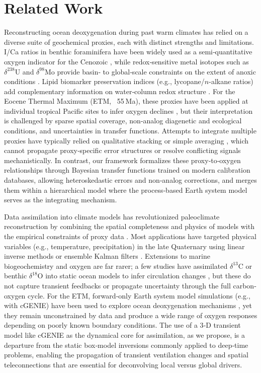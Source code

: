 \documentclass{article}
\begin{document}
\section{Related Work}

Reconstructing ocean deoxygenation during past warm climates has relied on a diverse suite of geochemical proxies, each with distinct strengths and limitations. I/Ca ratios in benthic foraminifera have been widely used as a semi‐quantitative oxygen indicator for the Cenozoic \cite{Dickson2012Iodine,Hoogakker2015ICa}, while redox‐sensitive metal isotopes such as $\delta^{238}$U and $\delta^{98}$Mo provide basin‐ to global‐scale constraints on the extent of anoxic conditions \cite{Lau2016Molybdenum,Hardisty2017Uranium}. Lipid biomarker preservation indices (e.g., lycopane/$n$-alkane ratios) add complementary information on water‐column redox structure \cite{Inglis2015Biomarkers}. For the Eocene Thermal Maximum (ETM, ~55 Ma), these proxies have been applied at individual tropical Pacific sites to infer oxygen declines \cite{Zachos2008ETM,Penman2014Boron}, but their interpretation is challenged by sparse spatial coverage, non‐analog diagenetic and ecological conditions, and uncertainties in transfer functions. Attempts to integrate multiple proxies have typically relied on qualitative stacking or simple averaging \cite{John2014Deoxygenation}, which cannot propagate proxy‐specific error structures or resolve conflicting signals mechanistically. In contrast, our framework formalizes these proxy‐to‐oxygen relationships through Bayesian transfer functions trained on modern calibration databases, allowing heteroskedastic errors and non‐analog corrections, and merges them within a hierarchical model where the process‐based Earth system model serves as the integrating mechanism.

Data assimilation into climate models has revolutionized paleoclimate reconstruction by combining the spatial completeness and physics of models with the empirical constraints of proxy data \cite{Annan2005Bayesian,Hargreaves2013PaleoDA}. Most applications have targeted physical variables (e.g., temperature, precipitation) in the late Quaternary using linear inverse methods or ensemble Kalman filters \cite{Tierney2019DataAssimilation}. Extensions to marine biogeochemistry and oxygen are far rarer; a few studies have assimilated $\delta^{13}$C or benthic $\delta^{18}$O into static ocean models to infer circulation changes \cite{Gebbie2017GM}, but these do not capture transient feedbacks or propagate uncertainty through the full carbon‐oxygen cycle. For the ETM, forward‐only Earth system model simulations (e.g., with cGENIE) have been used to explore ocean deoxygenation mechanisms \cite{Ridgwell2007cGENIE,John2013ECO2}, yet they remain unconstrained by data and produce a wide range of oxygen responses depending on poorly known boundary conditions. The use of a 3‐D transient model like cGENIE as the dynamical core for assimilation, as we propose, is a departure from the static box‐model inversions commonly applied to deep‐time problems, enabling the propagation of transient ventilation changes and spatial teleconnections that are essential for deconvolving local versus global drivers.
\end{document}
